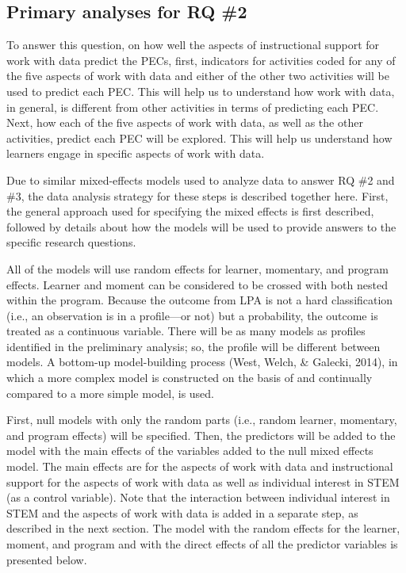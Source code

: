 \documentclass[]{msu-thesis}
\theoremstyle{definition}
\theoremstyle{definition}
\theoremstyle{definition}
\theoremstyle{remark}
\begin{document}
\subsection{Primary analyses for RQ
\#2}\label{primary-analyses-for-rq-2}

To answer this question, on how well the aspects of instructional
support for work with data predict the PECs, first, indicators for
activities coded for any of the five aspects of work with data and
either of the other two activities will be used to predict each PEC.
This will help us to understand how work with data, in general, is
different from other activities in terms of predicting each PEC. Next,
how each of the five aspects of work with data, as well as the other
activities, predict each PEC will be explored. This will help us
understand how learners engage in specific aspects of work with data.

Due to similar mixed-effects models used to analyze data to answer RQ
\#2 and \#3, the data analysis strategy for these steps is described
together here. First, the general approach used for specifying the mixed
effects is first described, followed by details about how the models
will be used to provide answers to the specific research questions.

All of the models will use random effects for learner, momentary, and
program effects. Learner and moment can be considered to be crossed with
both nested within the program. Because the outcome from LPA is not a
hard classification (i.e., an observation is in a profile---or not) but
a probability, the outcome is treated as a continuous variable. There
will be as many models as profiles identified in the preliminary
analysis; so, the profile will be different between models. A bottom-up
model-building process (West, Welch, \& Galecki, 2014), in which a more
complex model is constructed on the basis of and continually compared to
a more simple model, is used.

First, null models with only the random parts (i.e., random learner,
momentary, and program effects) will be specified. Then, the predictors
will be added to the model with the main effects of the variables added
to the null mixed effects model. The main effects are for the aspects of
work with data and instructional support for the aspects of work with
data as well as individual interest in STEM (as a control variable).
Note that the interaction between individual interest in STEM and the
aspects of work with data is added in a separate step, as described in
the next section. The model with the random effects for the learner,
moment, and program and with the direct effects of all the predictor
variables is presented below.
\end{document}
